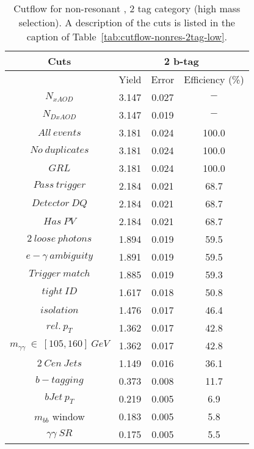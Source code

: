 \begin{table}\footnotesize
\begin{center}
\caption[Cutflow for non-resonant \hhyybb, 2 tag category (high mass selection)]{Cutflow for non-resonant \hhyybb, 2 tag category (high mass selection). A description of the cuts is listed in the caption of Table~\ref{tab:cutflow-nonres-2tag-low}.}
\label{tab:cutflow-nonres-2tag-high}
\begin{tabular}{|c|c|c|c|}
 \hline
Cuts& \multicolumn{3}{c|}{2 b-tag} \\ \hline
 &Yield&Error&Efficiency (\%)\\ \hline
$N_{xAOD}$ & 3.147&0.027 &$-$ \\
 \hline
$N_{DxAOD}$ & 3.147&0.019 &$-$ \\
 \hline
$All\ events$ & 3.181&0.024 &100.0 \\
 \hline
$No\ duplicates$ & 3.181&0.024 &100.0 \\
 \hline
$GRL$ & 3.181&0.024 &100.0 \\
 \hline
$Pass\ trigger$ & 2.184&0.021 &68.7 \\
 \hline
$Detector\ DQ$ & 2.184&0.021 &68.7 \\
 \hline
$Has\ PV$ & 2.184&0.021 &68.7 \\
 \hline
$2\ loose\ photons$ & 1.894&0.019 &59.5 \\
 \hline
$e-\gamma\ ambiguity$ & 1.891&0.019 &59.5 \\
 \hline
$Trigger\ match$ & 1.885&0.019 &59.3 \\
 \hline
$tight\ ID$ & 1.617&0.018 &50.8 \\
 \hline
$isolation$ & 1.476&0.017 &46.4 \\
 \hline
$rel.\ p_{T}$ & 1.362&0.017 &42.8 \\
 \hline
$m_{\gamma\gamma}\ \in\ [105,160]\ GeV$ & 1.362&0.017 &42.8 \\
 \hline
$2\ Cen\ Jets$ & 1.149&0.016 &36.1 \\
 \hline
$b-tagging$ & 0.373&0.008 &11.7 \\
 \hline
$bJet\ p_{T}$ & 0.219&0.005 & 6.9 \\
 \hline
$m_{bb}$ window & 0.183&0.005 & 5.8 \\
 \hline
$\gamma\gamma\ SR$ & 0.175&0.005 & 5.5 \\
 \hline
\end{tabular}
\end{center}
\end{table}
